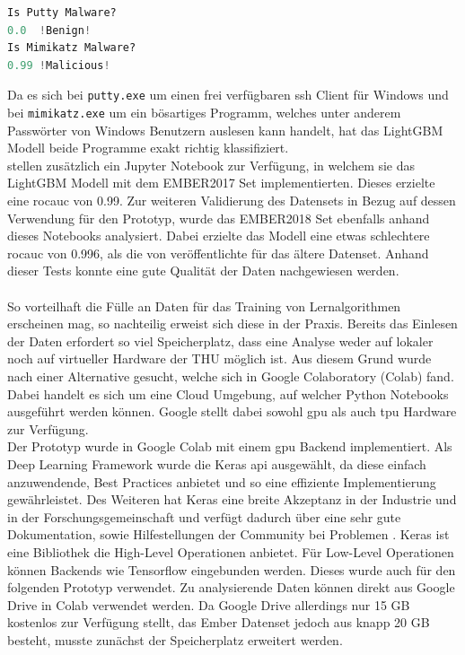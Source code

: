 \documentclass[
    12pt, %
    DIV10,
    ngerman, %
    a4paper, %
    oneside, %
    titlepage, %
    parskip=half, %
    headings=normal, %
    listof=totoc, %
    bibliography=totoc, %
    index=totoc, %
    captions=tableheading, %
    final %
]{scrreprt}
\begin{document}
\begin{lstlisting}[language=Python, caption=Ergebnis Python Testskript]
Is Putty Malware?
0.0  !Benign!
Is Mimikatz Malware?
0.99 !Malicious!
\end{lstlisting}
Da es sich bei \texttt{putty.exe} um einen frei verfügbaren \ac{ssh} Client für Windows und bei \texttt{mimikatz.exe} um ein bösartiges Programm, welches unter anderem Passwörter von Windows Benutzern auslesen kann handelt, hat das LightGBM Modell beide Programme exakt richtig klassifiziert.\\
\textcite{anderson2018ember} stellen zusätzlich ein Jupyter Notebook zur Verfügung, in welchem sie das  LightGBM Modell mit dem EMBER2017 Set implementierten. Dieses erzielte eine \ac{rocauc} von 0.99. Zur weiteren Validierung des Datensets in Bezug auf dessen Verwendung für den Prototyp, wurde das EMBER2018 Set ebenfalls anhand dieses Notebooks analysiert. Dabei erzielte das Modell eine etwas schlechtere \ac{rocauc} von 0.996, als die von \textcite{anderson2018ember} veröffentlichte für das ältere Datenset. Anhand dieser Tests konnte eine gute Qualität der Daten nachgewiesen werden.\\\\
So vorteilhaft die Fülle an Daten für das Training von Lernalgorithmen erscheinen mag, so nachteilig erweist sich diese in der Praxis.
Bereits das Einlesen der Daten erfordert so viel Speicherplatz, dass eine Analyse weder auf lokaler noch auf virtueller Hardware der THU möglich ist. 
Aus diesem Grund wurde nach einer Alternative gesucht, welche sich in Google Colaboratory (Colab) fand. Dabei handelt es sich um eine Cloud Umgebung, auf welcher Python Notebooks ausgeführt werden können. Google stellt dabei sowohl \ac{gpu} als auch \ac{tpu} Hardware zur Verfügung.\\
Der Prototyp wurde in Google Colab mit einem \ac{gpu} Backend implementiert. Als Deep Learning Framework wurde die Keras \ac{api} ausgewählt, da diese einfach anzuwendende, Best Practices anbietet und so eine effiziente Implementierung gewährleistet. Des Weiteren hat Keras eine breite Akzeptanz in der Industrie und in der Forschungsgemeinschaft und verfügt dadurch über eine sehr gute Dokumentation, sowie Hilfestellungen der Community bei Problemen \parencite{Keras}. Keras ist eine Bibliothek die High-Level Operationen anbietet. Für Low-Level Operationen können Backends wie Tensorflow eingebunden werden. Dieses wurde auch für den folgenden Prototyp verwendet. Zu analysierende Daten können direkt aus Google Drive in Colab verwendet werden. Da Google Drive allerdings nur 15 GB kostenlos zur Verfügung stellt, das Ember Datenset jedoch aus knapp 20 GB besteht, musste zunächst der Speicherplatz erweitert werden. 
\end{document}
